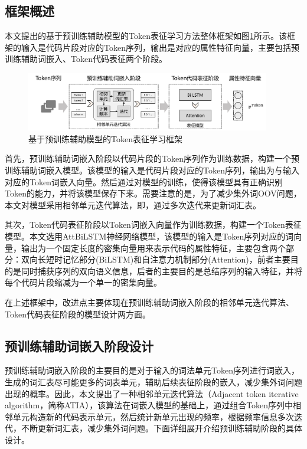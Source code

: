 \subsection{框架概述}
\label{subsec:TokenOverview}
本文提出的基于预训练辅助模型的Token表征学习方法整体框架如图\ref{fig:tokenframework}所示。该框架的输入是代码片段对应的Token序列，输出是对应的属性特征向量，主要包括预训练辅助词嵌入、Token代码表征两个阶段。

\begin{figure}[H]
  \centering
  \includegraphics[width=0.95\textwidth]{figures/tokenframework}
  \caption{基于预训练辅助模型的Token表征学习框架}\label{fig:tokenframework}
\end{figure}

首先，预训练辅助词嵌入阶段以代码片段的Token序列作为训练数据，构建一个预训练辅助词嵌入模型。该模型的输入是代码片段对应的Token序列，输出为与输入对应的Token词嵌入向量。然后通过对模型的训练，使得该模型具有正确识别Token的能力，并将该模型保存下来。需要注意的是，为了减少集外词OOV问题，本文对模型采用相邻单元迭代算法，即，通过多次迭代来更新词汇表。

其次，Token代码表征阶段以Token词嵌入向量作为训练数据，构建一个Token表征模型。本文选用AttBiLSTM神经网络模型，该模型的输入是Token序列对应的词向量，输出为一个固定长度的密集向量用来表示代码的属性特征，主要包含两个部分：双向长短时记忆部分(BiLSTM)和自注意力机制部分(Attention)，前者主要目的是同时捕获序列的双向语义信息，后者的主要目的是总结序列的输入特征，并将每个代码片段缩减为一个单一的密集向量。

在上述框架中，改进点主要体现在预训练辅助词嵌入阶段的相邻单元迭代算法、Token代码表征阶段的模型设计两方面。

\subsection{预训练辅助词嵌入阶段设计}
\label{subsec:TokenPreModel}

预训练辅助词嵌入阶段的主要目的是对于输入的词法单元Token序列进行词嵌入，生成的词汇表尽可能更多的词表单元，辅助后续表征阶段的嵌入，减少集外词问题出现的概率。因此，本文提出了一种相邻单元迭代算法（Adjacent token iterative algorithm，简称ATIA），该算法在词嵌入模型的基础上，通过组合Token序列中相邻单元构造新的代码表示单元，然后统计新单元出现的频率，根据频率信息多次迭代，不断更新词汇表，减少集外词问题。下面详细展开介绍预训练辅助阶段的具体设计。

